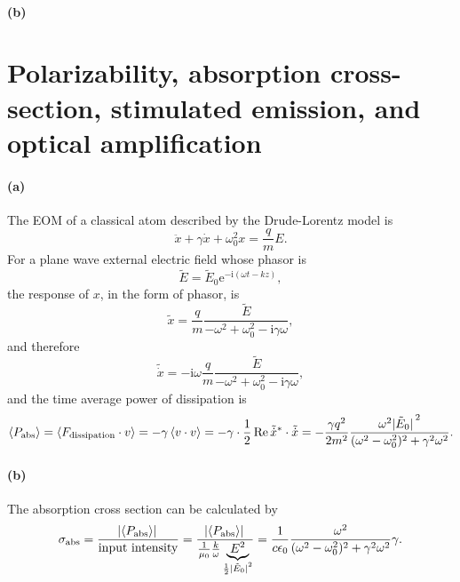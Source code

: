 \documentclass[hyperref, a4paper]{article}
\newcommand*{\ii}{\mathrm{i}}
\newcommand*{\ee}{\mathrm{e}}
\begin{document}
\paragraph{(b)} 

\section{Polarizability, absorption cross-section, stimulated emission, and optical amplification}

\paragraph{(a)} The EOM of a classical atom described by the Drude-Lorentz model is 
\begin{equation}
    \ddot{x} + \gamma \dot{x} + \omega_0^2 x = \frac{q}{m} E.
\end{equation}
For a plane wave external electric field whose phasor is 
\begin{equation}
    \tilde{E} = \tilde{E}_0 \ee^{- \ii (\omega t - k z)},
\end{equation}
the response of $x$, in the form of phasor, is 
\begin{equation}
    \tilde{x} = \frac{q}{m} \frac{\tilde{E}}{- \omega^2 + \omega_0^2 - \ii \gamma \omega},
    \label{eq:x-e-relation}
\end{equation}
and therefore 
\begin{equation}
    \tilde{\dot{x}} = - \ii \omega \frac{q}{m} \frac{\tilde{E}}{- \omega^2 + \omega_0^2 - \ii \gamma \omega},
\end{equation}
and the time average power of dissipation is 
\begin{equation}
    \expval{P_\text{abs}} = \expval{F_\text{dissipation} \cdot v} 
    = - \gamma \expval{v \cdot v} = - \gamma \cdot \frac{1}{2} \Re \tilde{\dot{x}}^* \cdot \tilde{\dot{x}}
    = - \frac{\gamma q^2}{2 m^2} \frac{\omega^2 \abs*{\tilde{E}_0}^2}{
        (\omega^2 - \omega_0^2)^2 + \gamma^2 \omega^2
    }.
\end{equation}

\paragraph{(b)} The absorption cross section can be calculated by 
\begin{equation}
    \sigma_\text{abs} = \frac{\abs*{\expval{P_\text{abs}}}}{\text{input intensity}}
    = \frac{\abs*{\expval{P_\text{abs}}}}{
        \frac{1}{\mu_0} \frac{k}{\omega} \underbrace{
            E^2
        }_{\frac{1}{2} \abs*{\tilde{E}_0}^2}   
    }
    = \frac{1}{c \epsilon_0} \frac{\omega^2}{
        (\omega^2 - \omega_0^2)^2 + \gamma^2 \omega^2
    } \gamma.
\end{equation}
\end{document}
